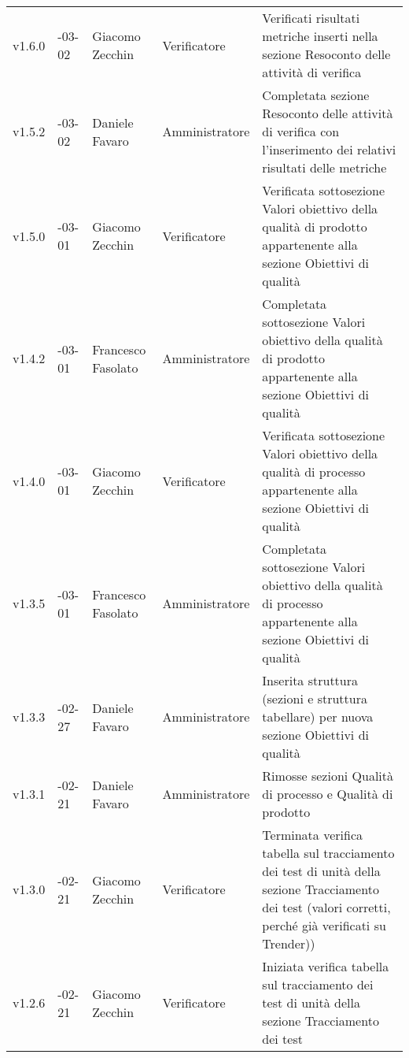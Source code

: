 \begin{longtable} { >{\centering}p{1.4cm} >{\centering}p{2cm} >{\centering}p{2.3cm} >{\centering}p{2.7cm} p{5.5cm} }
	\addlinespace[0.4em]
	\midrule
	\addlinespace[0.4em]
	v1.6.0 & 2017-03-02 & Giacomo Zecchin & Verificatore & Verificati risultati metriche inserti nella sezione Resoconto delle attività di verifica \\
	\addlinespace[0.4em]
	\midrule
	\addlinespace[0.4em]
	v1.5.2 & 2017-03-02 & Daniele Favaro & Amministratore & Completata sezione Resoconto delle attività di verifica con l'inserimento dei relativi risultati delle metriche\\
	\addlinespace[0.4em]
	\midrule
	\addlinespace[0.4em]
	v1.5.0 & 2017-03-01 & Giacomo Zecchin & Verificatore & Verificata sottosezione Valori obiettivo della qualità di prodotto appartenente alla sezione Obiettivi di qualità \\
	\addlinespace[0.4em]
	\midrule
	\addlinespace[0.4em]
	v1.4.2 & 2017-03-01 & Francesco Fasolato & Amministratore & Completata sottosezione Valori obiettivo della qualità di prodotto appartenente alla sezione Obiettivi di qualità \\
	\addlinespace[0.4em]
	\midrule
	\addlinespace[0.4em]
	v1.4.0 & 2017-03-01 & Giacomo Zecchin & Verificatore & Verificata sottosezione Valori obiettivo della qualità di processo appartenente alla sezione Obiettivi di qualità \\
	\addlinespace[0.4em]
	\midrule
	\addlinespace[0.4em]	
	v1.3.5 & 2017-03-01 & Francesco Fasolato & Amministratore & Completata sottosezione Valori obiettivo della qualità di processo appartenente alla sezione Obiettivi di qualità \\ 
	\addlinespace[0.4em]
	\midrule
	\addlinespace[0.4em]
	v1.3.3 & 2017-02-27 & Daniele Favaro & Amministratore & Inserita struttura (sezioni e struttura tabellare) per nuova sezione Obiettivi di qualità \\ 
	\addlinespace[0.4em]
	\midrule
	\addlinespace[0.4em]
	v1.3.1 & 2017-02-21 & Daniele Favaro & Amministratore & Rimosse sezioni Qualità di processo e Qualità di prodotto \\
	\addlinespace[0.4em]
	\midrule
	\addlinespace[0.4em]	
	v1.3.0 & 2017-02-21 & Giacomo Zecchin & Verificatore & Terminata verifica tabella sul tracciamento dei test di unità della sezione Tracciamento dei test (valori corretti, perché già verificati su Trender)) \\ 
	\addlinespace[0.4em]
	\midrule
	\addlinespace[0.4em]
	v1.2.6 & 2017-02-21 & Giacomo Zecchin & Verificatore & Iniziata verifica tabella sul tracciamento dei test di unità della sezione Tracciamento dei test \\ 

\end{longtable}
